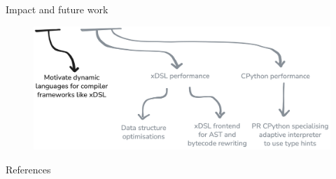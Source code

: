 \documentclass[10pt,aspectratio=169]{beamer}
\begin{document}
\begin{frame}{Impact and future work}
    \begin{figure}[H]
        \hspace*{-1cm}
        \includegraphics[width=\textwidth]{images/impact_future_work.png}
        \vspace{2cm}
    \end{figure}
\end{frame}

\appendix

\maketitle

\begin{frame}[allowframebreaks]{References}
    \printbibliography[heading=none]
\end{frame}
\end{document}
